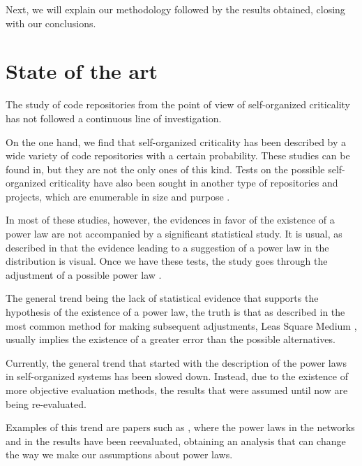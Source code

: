 \documentclass{article}
\begin{document}

Next, we will explain our methodology followed by the results
obtained, closing with our conclusions.



\section{State of the art}\label{soa}

The study of code repositories from the point of view of
self-organized criticality has not followed a continuous line of
investigation. %

On the one hand, we find that self-organized criticality has been
described by a wide variety of code repositories with a certain
probability. These studies can be found
in\cite{wu2007empirical,gorshenev2004punctuated}, but they are not the
only ones of this kind. Tests on the possible self-organized
criticality have also been sought in another type of repositories and
projects, which are enumerable in size and purpose
\cite{Merelo2016:repomining,merelo16:slash,merelo16:self,merelo2017self}.

In most of these studies, however, the evidences in favor of the
existence of a power law are not accompanied by a significant
statistical study. It is usual, as described in \cite{newman2005power}
that the evidence leading to a suggestion of a power law in the
distribution is visual. Once we have these tests, the study goes
through the adjustment of a possible power law
\cite{merelo2017self,arafat2009commit}.

The general trend being the lack of statistical evidence that supports
the hypothesis of the existence of a power law, the truth is that as
described in \cite{newman2005power, clauset2009power} the most common
method for making subsequent adjustments, Leas Square Medium
\cite{merelo2017self,arafat2009commit,merelo16:self}, usually implies
the existence of a greater error than the possible alternatives.

Currently, the general trend that started with the description of the
power laws in self-organized systems has been slowed down. Instead,
due to the existence of more objective evaluation methods, the results
that were assumed until now are being re-evaluated.

Examples of this trend are papers such as \cite{Holme2019,
  Broido2019}, where the power laws in the networks and in the results
have been reevaluated, obtaining an analysis that can change the way
we make our assumptions about power laws.
\end{document}
